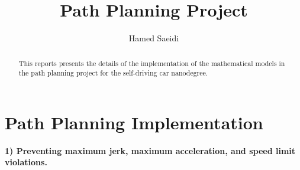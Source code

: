 \documentclass[12pt]{article}
\begin{document}
\renewcommand{\thesection}{\Roman{section}.}


\title{Path Planning Project}
\author{Hamed Saeidi}
\maketitle
\renewcommand{\topfraction}{0.85}
\begin{abstract}
This reports presents the details of the implementation of the mathematical models in the path planning project for the self-driving car nanodegree. 
\end{abstract}
\section*{Path Planning Implementation}
\textbf{ 1) Preventing maximum jerk, maximum acceleration, and speed limit violations.}
\newline
\end{document}
